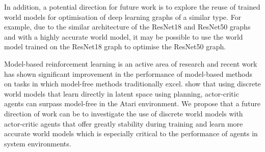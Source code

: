 In addition, a potential direction for future work is to explore the reuse of trained world models for optimisation of deep learning graphs of a similar type. For example, due to the similar architecture of the ResNet18 and ResNet50 graphs and with a highly accurate world model, it may be possible to use the world model trained on the ResNet18 graph to optimise the ResNet50 graph.

Model-based reinforcement learning is an active area of research and recent work has shown significant improvement in the performance of model-based methods on tasks in which model-free methods traditionally excel. \citet{hafner2021mastering} show that using discrete world models that learn directly in latent space using planning, actor-critic agents can surpass model-free in the Atari environment. We propose that a future direction of work can be to investigate the use of discrete world models with actor-critic agents that offer greatly stability during training and learn more accurate world models which is especially critical to the performance of agents in system environments.
